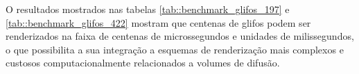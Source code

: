 \documentclass[
    12pt,                %
    oneside,            %
    a4paper,            %
    english,            %
    french,                %
    spanish,            %
    brazil                %
    ]{abntex2}
\begin{document}

O resultados mostrados nas tabelas \ref{tab::benchmark_glifos_197} e \ref{tab::benchmark_glifos_422} mostram que centenas de glifos podem ser renderizados na faixa de centenas de microssegundos e unidades de milissegundos, o que possibilita a sua integração a esquemas de renderização mais complexos e custosos computacionalmente relacionados a volumes de difusão.

\pagebreak










\end{document}
